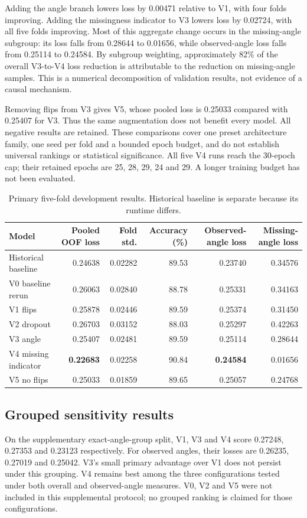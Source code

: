 \documentclass[journal]{IEEEtran}
\begin{document}
Adding the angle branch lowers loss by 0.00471 relative to V1, with four folds improving. Adding the missingness indicator to V3 lowers loss by 0.02724, with all five folds improving. Most of this aggregate change occurs in the missing-angle subgroup: its loss falls from 0.28644 to 0.01656, while observed-angle loss falls from 0.25114 to 0.24584. By subgroup weighting, approximately 82\% of the overall V3-to-V4 loss reduction is attributable to the reduction on missing-angle samples. This is a numerical decomposition of validation results, not evidence of a causal mechanism.

Removing flips from V3 gives V5, whose pooled loss is 0.25033 compared with 0.25407 for V3. Thus the same augmentation does not benefit every model. All negative results are retained. These comparisons cover one preset architecture family, one seed per fold and a bounded epoch budget, and do not establish universal rankings or statistical significance. All five V4 runs reach the 30-epoch cap; their retained epochs are 25, 28, 29, 24 and 29. A longer training budget has not been evaluated.

\begin{table}[t]
\caption{Primary five-fold development results. Historical baseline is separate because its runtime differs.}
\label{tab:primary}\centering
\begin{tabular}{lrrrrr}\toprule
Model & Pooled OOF loss & Fold std. & Accuracy (\%) & Observed-angle loss & Missing-angle loss\\\midrule
Historical baseline & 0.24638 & 0.02282 & 89.53 & 0.23740 & 0.34576\\
V0 baseline rerun & 0.26063 & 0.02840 & 88.78 & 0.25331 & 0.34163\\
V1 flips & 0.25878 & 0.02446 & 89.59 & 0.25374 & 0.31450\\
V2 dropout & 0.26703 & 0.03152 & 88.03 & 0.25297 & 0.42263\\
V3 angle & 0.25407 & 0.02481 & 89.59 & 0.25114 & 0.28644\\
V4 missing indicator & \textbf{0.22683} & 0.02258 & 90.84 & \textbf{0.24584} & 0.01656\\
V5 no flips & 0.25033 & 0.01859 & 89.65 & 0.25057 & 0.24768\\\bottomrule
\end{tabular}
\end{table}

\subsection{Grouped sensitivity results}
On the supplementary exact-angle-group split, V1, V3 and V4 score 0.27248, 0.27353 and 0.23123 respectively. For observed angles, their losses are 0.26235, 0.27019 and 0.25042. V3's small primary advantage over V1 does not persist under this grouping. V4 remains best among the three configurations tested under both overall and observed-angle measures. V0, V2 and V5 were not included in this supplemental protocol; no grouped ranking is claimed for those configurations.
\end{document}
